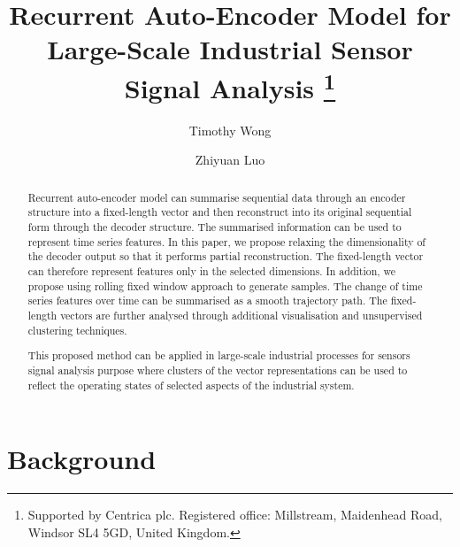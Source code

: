 \documentclass[runningheads]{llncs}
\begin{document}
%
\title{Recurrent Auto-Encoder Model for\\ Large-Scale Industrial Sensor Signal Analysis
	\thanks{Supported by Centrica plc. Registered office: Millstream, Maidenhead Road, Windsor SL4 5GD, United Kingdom.}}
%
%
\author{Timothy Wong \and
Zhiyuan Luo}
%
%
%
\maketitle              %
%
\begin{abstract}

Recurrent auto-encoder model can summarise sequential data through an encoder structure into a fixed-length vector and then reconstruct into its original sequential form through the decoder structure. The summarised information can be used to represent time series features. In this paper, we propose relaxing the dimensionality of the decoder output so that it performs partial reconstruction. The fixed-length vector can therefore represent features only in the selected dimensions. In addition, we propose using rolling fixed window approach to generate samples. The change of time series features over time can be summarised as a smooth trajectory path. The fixed-length vectors are further analysed through additional visualisation and unsupervised clustering techniques. 

This proposed method can be applied in large-scale industrial processes for sensors signal analysis purpose where clusters of the vector representations can be used to reflect the operating states of selected aspects of the industrial system.

\end{abstract}
%
%
%

\section{Background}
\end{document}

